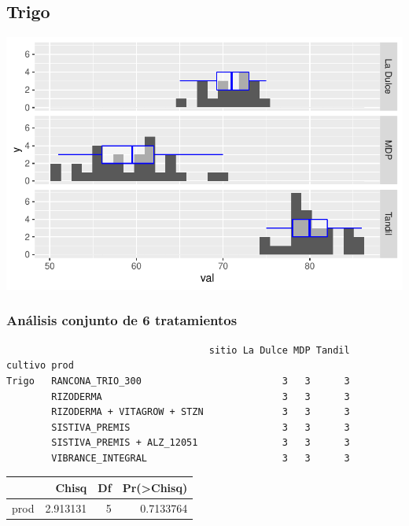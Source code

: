 \documentclass[
  letterpaper,
  DIV=11,
  numbers=noendperiod]{scrartcl}
\begin{document}
\hypertarget{trigo}{%
\subsection{Trigo}\label{trigo}}

\includegraphics{curasem_files/figure-pdf/unnamed-chunk-10-1.pdf}

\hypertarget{anuxe1lisis-conjunto-de-6-tratamientos-1}{%
\subsubsection{Análisis conjunto de 6
tratamientos}\label{anuxe1lisis-conjunto-de-6-tratamientos-1}}

\begin{verbatim}
                                    sitio La Dulce MDP Tandil
cultivo prod                                                 
Trigo   RANCONA_TRIO_300                         3   3      3
        RIZODERMA                                3   3      3
        RIZODERMA + VITAGROW + STZN              3   3      3
        SISTIVA_PREMIS                           3   3      3
        SISTIVA_PREMIS + ALZ_12051               3   3      3
        VIBRANCE_INTEGRAL                        3   3      3
\end{verbatim}

\begin{longtable}[]{@{}lrrr@{}}
\toprule()
& Chisq & Df & Pr(\textgreater Chisq) \\
\midrule()
\endhead
prod & 2.913131 & 5 & 0.7133764 \\
\bottomrule()
\end{longtable}
\end{document}
